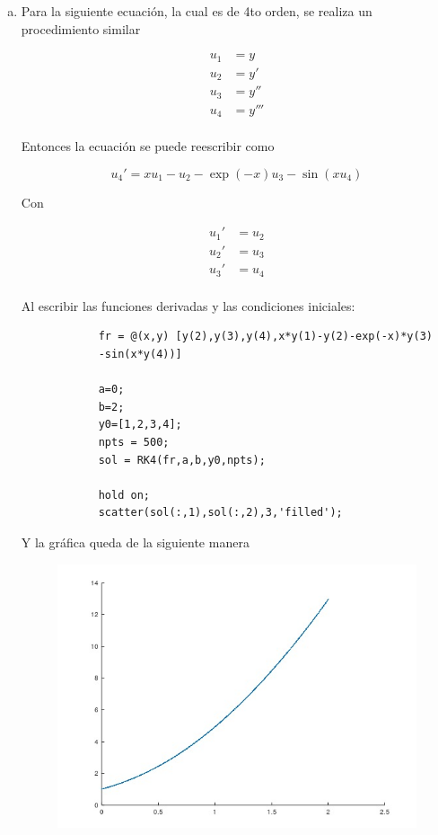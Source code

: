 \documentclass[a4paper, 12pt]{article}
\begin{document}
\begin{enumerate}[a)]
        \item Para la siguiente ecuación, la cual es de 4to orden, se realiza un procedimiento similar
        
        \begin{align*}
            u_1 &= y \\
            u_2 &= y' \\
            u_3 &= y'' \\
            u_4 &= y''' \\
        \end{align*}

        Entonces la ecuación se puede reescribir como

        \[
            u_4' = xu_1 - u_2 - \exp(-x)u_3 - \sin(xu_4)
        \]

        Con

        \begin{align}
            u_1' &= u_2 \\
            u_2' &= u_3 \\
            u_3' &= u_4 \\
        \end{align}

        Al escribir las funciones derivadas y las condiciones iniciales:

        \begin{verbatim}
            fr = @(x,y) [y(2),y(3),y(4),x*y(1)-y(2)-exp(-x)*y(3)
            -sin(x*y(4))]

            a=0;
            b=2;
            y0=[1,2,3,4];
            npts = 500;
            sol = RK4(fr,a,b,y0,npts);

            hold on;
            scatter(sol(:,1),sol(:,2),3,'filled');
        \end{verbatim}

        Y la gráfica queda de la siguiente manera

        \begin{figure}[ht!]
            \centering
            \includegraphics[width=16cm]{img/e1b.jpeg}
        \end{figure}

    \end{enumerate}
\end{document}

